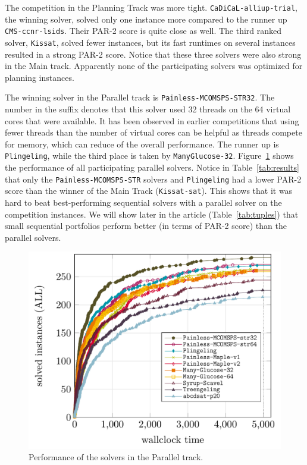 \documentclass{elsarticle}
\newcommand{\solver}[1]{\texttt{#1}}
\begin{document}
The competition in the Planning Track was more tight. \solver{CaDiCaL-alliup-trial}, the winning solver, 
solved only one instance more compared to the runner up \solver{CMS-ccnr-lsids}. Their PAR-2 score is 
quite close as well. The third ranked solver, \solver{Kissat}, solved fewer instances, but its fast runtimes
on several instances resulted in a strong PAR-2 score. Notice that these three solvers were also strong in the Main track. 
Apparently none of the participating solvers was optimized for planning instances. 

The winning solver in the Parallel track is \solver{Painless-MCOMSPS-STR32}. The number in the suffix denotes
that this solver used 32 threads on the 64 virtual cores that were available. It has been observed in earlier 
competitions that using fewer threads than the number of virtual cores can be helpful as threads compete 
for memory, which can reduce of the overall performance. The runner up is \solver{Plingeling}, while the
third place is taken by \solver{ManyGlucose-32}. Figure~\ref{fig:res-parallel} shows the performance of
all participating parallel solvers. Notice in Table~\ref{tab:results} that only the \solver{Painless-MCOMSPS-STR} solvers
and \solver{Plingeling} had a lower PAR-2 score than the winner of the Main Track (\solver{Kissat-sat}). 
This shows that it was hard to beat best-performing sequential solvers with a parallel solver on the competition instances. 
We will show later in the article (Table~\ref{tab:tuples}) that small sequential portfolios 
perform better (in terms of PAR-2 score) than the parallel solvers. 

\begin{figure}[ht]
\centering
\includegraphics[width=.9\textwidth]{img/parallel-ALL.pdf}
\caption{Performance of the solvers in the Parallel track.}
\label{fig:res-parallel}
\end{figure}
\end{document}
